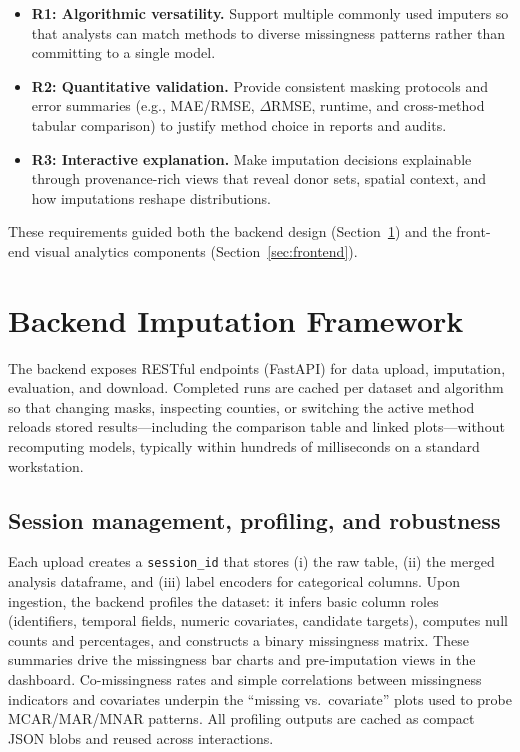 \documentclass{egpubl}
\begin{document}
\begin{itemize}[leftmargin=*]
  \item \textbf{R1: Algorithmic versatility.} Support multiple commonly used imputers so that analysts can match methods to diverse missingness patterns rather than committing to a single model.
  \item \textbf{R2: Quantitative validation.} Provide consistent masking protocols and error summaries (e.g., MAE/RMSE, $\Delta$RMSE, runtime, and cross-method tabular comparison) to justify method choice in reports and audits.
  \item \textbf{R3: Interactive explanation.} Make imputation decisions explainable through provenance-rich views that reveal donor sets, spatial context, and how imputations reshape distributions.
\end{itemize}

These requirements guided both the backend design (Section~\ref{sec:backend}) and the front-end visual analytics components (Section~\ref{sec:frontend}).


\section{Backend Imputation Framework}
\label{sec:backend}
The backend exposes RESTful endpoints (FastAPI) for data upload, imputation, evaluation, and download. Completed runs are cached per dataset and algorithm so that changing masks, inspecting counties, or switching the active method reloads stored results---including the comparison table and linked plots---without recomputing models, typically within hundreds of milliseconds on a standard workstation.

\subsection{Session management, profiling, and robustness}
Each upload creates a \texttt{session\_id} that stores (i) the raw table, (ii) the merged analysis dataframe, and (iii) label encoders for categorical columns. Upon ingestion, the backend profiles the dataset: it infers basic column roles (identifiers, temporal fields, numeric covariates, candidate targets), computes null counts and percentages, and constructs a binary missingness matrix. These summaries drive the missingness bar charts and pre-imputation views in the dashboard. Co-missingness rates and simple correlations between missingness indicators and covariates underpin the “missing vs.\ covariate” plots used to probe MCAR/MAR/MNAR patterns. All profiling outputs are cached as compact JSON blobs and reused across interactions.
\end{document}
